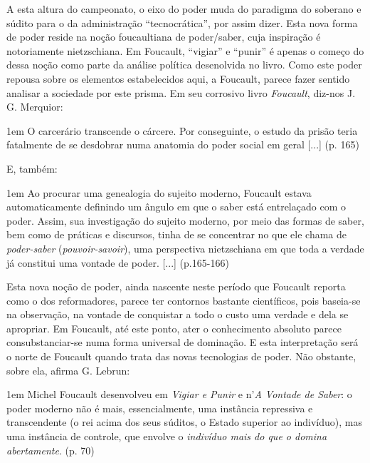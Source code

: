 \documentclass[12pt,a4paper]{article}
\newenvironment{citac}
{
	\begin{addmargin}
		[4cm]{1em} \footnotesize}{\normalfont 
	\end{addmargin}
}
\begin{document}
	A esta altura do campeonato, o eixo do poder muda do paradigma do 
	soberano e súdito para o da administração ``tecnocrática'', por 
	assim dizer. Esta nova forma de poder reside na noção foucaultiana 
	de poder/saber, cuja inspiração é notoriamente nietzschiana. Em 
	Foucault, ``vigiar'' e ``punir'' é apenas o começo do 
	dessa noção como parte da análise política desenolvida no livro. 
	Como este poder repousa sobre os elementos estabelecidos 
	aqui, a Foucault, parece fazer sentido analisar a sociedade por 
	este prisma. Em seu corrosivo livro \textit{Foucault}, diz-nos 
	J. G. Merquior: 

	\begin{citac}
		O carcerário transcende o cárcere. Por conseguinte, o estudo 
		da prisão teria fatalmente de se desdobrar numa anatomia do poder 
		social em geral [...] \cite{merquior} (p. 165)
	\end{citac}

	E, também: 

	\begin{citac}
		Ao procurar uma genealogia do sujeito moderno, Foucault estava 
		automaticamente definindo um ângulo em que o saber está entrelaçado 
		com o poder. Assim, sua investigação do sujeito moderno, por meio das 
		formas de saber, bem como de práticas e discursos, tinha de se 
		concentrar no que ele chama de \textit{poder-saber} (\textit
		{pouvoir-savoir}), uma perspectiva nietzschiana em que toda a verdade 
		já constitui uma vontade de poder. [...] \cite{merquior} (p.165-166)
	\end{citac}

	Esta nova noção de poder, ainda nascente neste período que Foucault 
	reporta como o dos reformadores, parece ter contornos bastante 
	científicos, pois baseia-se na observação, na vontade de conquistar 
	a todo o custo uma verdade e dela se apropriar. Em Foucault, até 
	este ponto, ater o conhecimento absoluto parece consubstanciar-se 
	numa forma universal de dominação. E esta interpretação será o norte 
	de Foucault quando trata das novas tecnologias de poder. 
	Não obstante, sobre ela, afirma G. Lebrun: 
	
	\begin{citac}
		Michel Foucault desenvolveu em \textit{Vigiar e Punir} 
		e n’\textit{A Vontade de Saber}: o poder moderno não é mais, 
		essencialmente, uma instância repressiva e transcendente 
		(o rei acima dos seus súditos, o Estado superior ao indivíduo), 
		mas uma instância de controle, que envolve o \textit{indivíduo 
		mais do que o domina abertamente}. \cite{lebrun} (p. 70) 
	\end{citac}
\end{document}

